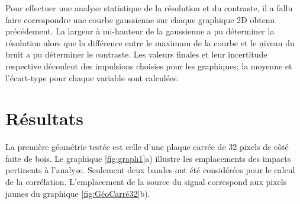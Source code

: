 \documentclass[conference]{IEEEtran}
\begin{document}
Pour effectuer une analyse statistique de la résolution et du contraste, il a fallu 
faire correspondre une courbe gaussienne sur chaque graphique 2D obtenu précédement. 
La largeur à mi-hauteur de la gaussienne a pu déterminer la résolution alors que la 
différence entre le maximum de la courbe et le niveau du bruit a pu déterminer le contraste.
Les valeurs finales et leur incertitude respective découlent des impulsions choisies pour 
les graphiques; la moyenne et l'écart-type pour chaque variable sont calculées.









\section{Résultats}


La première géométrie testée est celle d'une plaque carrée de 32 pixels de côté faite de bois. Le graphique \ref{fig:graph1}a)
illustre les emplacements des impacts pertinents à l'analyse. Seulement deux bandes ont été considérées
pour le calcul de la corrélation. L'emplacement de la source du signal correspond aux pixels jaunes du
graphique \ref{fig:GéoCarré32}b).
\end{document}

